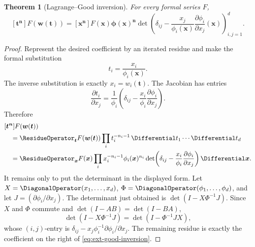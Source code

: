 \documentclass[11pt,a4paper,oneside,openany]{book}
\newtheorem{theorem}{Theorem}[chapter]
\theoremstyle{definition}
\theoremstyle{remark}
\begin{document}
\begin{theorem}[Lagrange--Good inversion]
\label{thm:ext-good-inversion}
For every formal series \(F\),
\begin{equation}\label{eq:ext-good-inversion}
 [\boldsymbol t^{\boldsymbol n}]F(\boldsymbol w(\boldsymbol t))
 =[\boldsymbol x^{\boldsymbol n}]
 F(\boldsymbol x)\boldsymbol\phi(\boldsymbol x)^{\boldsymbol n}
 \det\!\left(
 \delta_{ij}-\frac{x_j}{\phi_i(\boldsymbol x)}
                  \frac{\partial\phi_i}{\partial x_j}(\boldsymbol x)
 \right)_{i,j=1}^d.
\end{equation}
\end{theorem}
\begin{proof}
Represent the desired coefficient by an iterated residue and make the formal
substitution
\begin{equation}\label{eq:ext-good-change}
 t_i=\frac{x_i}{\phi_i(\boldsymbol x)}.
\end{equation}
The inverse substitution is exactly \(x_i=w_i(\boldsymbol t)\).  The Jacobian
has entries
\[
 \frac{\partial t_i}{\partial x_j}
 =\frac1{\phi_i}\left(
   \delta_{ij}-\frac{x_i}{\phi_i}\frac{\partial\phi_i}{\partial x_j}
 \right).
\]
Therefore
\begin{align*}
 &[\boldsymbol t^{\boldsymbol n}]F(\boldsymbol w(\boldsymbol t))\\
 &\quad=\ResidueOperator_{\boldsymbol t}
 F(\boldsymbol w(\boldsymbol t))
 \prod_i t_i^{-n_i-1}\,\Differential t_1\cdots\Differential t_d\\
 &\quad=\ResidueOperator_{\boldsymbol x}F(\boldsymbol x)
 \prod_i x_i^{-n_i-1}\phi_i(\boldsymbol x)^{n_i}
 \det\!\left(
 \delta_{ij}-\frac{x_i}{\phi_i}
                 \frac{\partial\phi_i}{\partial x_j}
 \right)\Differential\boldsymbol x.
\end{align*}
It remains only to put the determinant in the displayed form.  Let
\(X=\DiagonalOperator(x_1,\ldots,x_d)\),
\(\Phi=\DiagonalOperator(\phi_1,\ldots,\phi_d)\), and let
\(J=(\partial\phi_i/\partial x_j)\).  The determinant just obtained is
\(\det(I-X\Phi^{-1}J)\).  Since \(X\) and \(\Phi\) commute and
\(\det(I-AB)=\det(I-BA)\),
\[
 \det(I-X\Phi^{-1}J)=\det(I-\Phi^{-1}JX),
\]
whose \((i,j)\)-entry is
\(\delta_{ij}-x_j\phi_i^{-1}\partial\phi_i/\partial x_j\).
The remaining residue is exactly the coefficient on the right of
\eqref{eq:ext-good-inversion}.
\end{proof}
\end{document}
